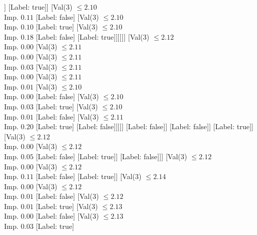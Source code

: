 \documentclass[margin=10pt]{standalone}
\begin{document}
\begin{forest}
													]
												[Label: true]]
											[Val($3$) $ \leq 2.10$ \\ Imp. $0.11$
												[Label: false]
												[Val($3$) $ \leq 2.10$ \\ Imp. $0.10$
													[Label: true]
													[Val($3$) $ \leq 2.10$ \\ Imp. $0.18$
														[Label: false]
														[Label: true]]]]]]
									[Val($3$) $ \leq 2.12$ \\ Imp. $0.00$
										[Val($3$) $ \leq 2.11$ \\ Imp. $0.00$
											[Val($3$) $ \leq 2.11$ \\ Imp. $0.03$
												[Val($3$) $ \leq 2.11$ \\ Imp. $0.00$
													[Val($3$) $ \leq 2.11$ \\ Imp. $0.01$
														[Val($3$) $ \leq 2.10$ \\ Imp. $0.00$
															[Label: false]
															[Val($3$) $ \leq 2.10$ \\ Imp. $0.03$
																[Label: true]
																[Val($3$) $ \leq 2.10$ \\ Imp. $0.01$
																	[Label: false]
																	[Val($3$) $ \leq 2.11$ \\ Imp. $0.20$
																		[Label: true]
																		[Label: false]]]]]
														[Label: false]]
													[Label: false]]
												[Label: true]]
											[Val($3$) $ \leq 2.12$ \\ Imp. $0.00$
												[Val($3$) $ \leq 2.12$ \\ Imp. $0.05$
													[Label: false]
													[Label: true]]
												[Label: false]]]
										[Val($3$) $ \leq 2.12$ \\ Imp. $0.00$
											[Val($3$) $ \leq 2.12$ \\ Imp. $0.11$
												[Label: false]
												[Label: true]]
											[Val($3$) $ \leq 2.14$ \\ Imp. $0.00$
												[Val($3$) $ \leq 2.12$ \\ Imp. $0.01$
													[Label: false]
													[Val($3$) $ \leq 2.12$ \\ Imp. $0.01$
														[Label: true]
														[Val($3$) $ \leq 2.13$ \\ Imp. $0.00$
															[Label: false]
															[Val($3$) $ \leq 2.13$ \\ Imp. $0.03$
																[Label: true]

\end{forest}
\end{document}
